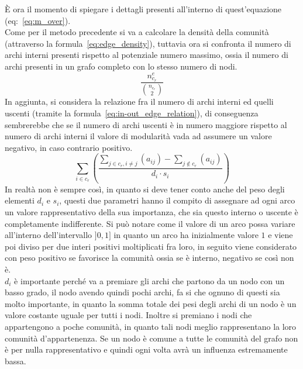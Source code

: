 È ora il momento di spiegare i dettagli presenti all'interno di quest'equazione (eq:~\ref{eq:m_over}).\\
Come per il metodo precedente si va a calcolare la densità della comunità (attraverso la formula~\ref{eq:edge_density}), tuttavia ora si confronta il numero di archi interni presenti rispetto al potenziale numero massimo, ossia il numero di archi presenti in un grafo completo con lo stesso numero di nodi.
\begin{equation}
	\frac{ n^e_{c_r} }{ \binom{n_{c_r}}{2} }
	\label{eq:edge_density}
\end{equation}
%
In aggiunta, si considera la relazione fra il numero di archi interni ed quelli uscenti (tramite la formula~\ref{eq:in-out_edge_relation}), di conseguenza sembrerebbe che se il numero di archi uscenti è in numero maggiore rispetto al numero di archi interni il valore di modularità vada ad assumere un valore negativo, in caso contrario positivo.\\
\begin{equation}
	\sum\limits_{i \in c_r} \left( \frac{
		\sum\limits_{j \in c_r, i \neq j} \left( a_{ij} \right) - 
		\sum\limits_{j \notin c_r} \left( a_{ij} \right) 
	} {d_i \cdot s_i} \right)
	\label{eq:in-out_edge_relation}
\end{equation}
In realtà non è sempre così, in quanto si deve tener conto anche del peso degli elementi $d_i$ e $s_i$, questi due parametri hanno il compito di assegnare ad ogni arco un valore rappresentativo della sua importanza, che sia questo interno o uscente è completamente indifferente. Si può notare come il valore di un arco possa variare all'interno dell'intervallo $]0, 1]$ in quanto un arco ha inizialmente valore $1$ e viene poi diviso per due interi positivi moltiplicati fra loro, in seguito viene considerato con peso positivo se favorisce la comunità ossia se è interno, negativo se così non è.\\
$d_i$ è importante perché va a premiare gli archi che partono da un nodo con un basso grado, il nodo avendo quindi pochi archi, fa si che ognuno di questi sia molto importante, in quanto la somma totale dei pesi degli archi di un nodo è un valore costante uguale per tutti i nodi. Inoltre si premiano i nodi che appartengono a poche comunità, in quanto tali nodi meglio rappresentano la loro comunità d'appartenenza. Se un nodo è comune a tutte le comunità del grafo non è per nulla rappresentativo e quindi ogni volta avrà un influenza estremamente bassa.\\
\\
